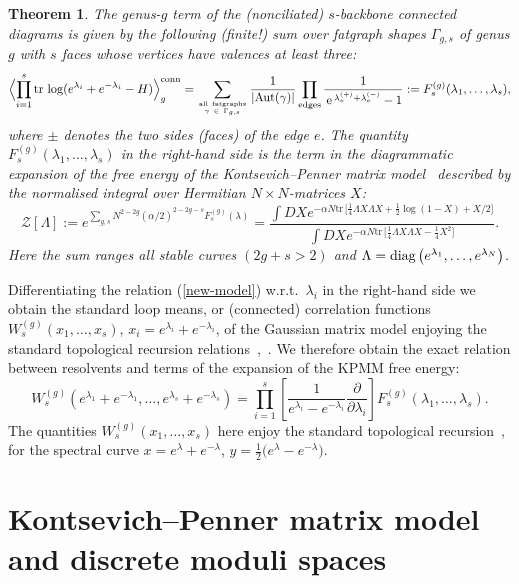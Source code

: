 \documentclass[11pt]{article}
\def\tr{{\mathrm{tr\,}}}
\def\e{{\,\rm e}\,}
\def\pa{\partial}
\def\beq{\begin{equation}}
\def\eeq{\end{equation}}
\theoremstyle{plain}
\newtheorem{theorem}{Theorem}
\theoremstyle{definition}
\let\operatorname=\mathrm
\def\Aut{\operatorname{Aut}}
\def\beq{\begin{equation}}
\def\eeq{\end{equation}}
\begin{document}
\begin{theorem}\label{lm:diagrams}{\rm\cite{ACNP}}
The genus-$g$ term of the (nonciliated) $s$-backbone connected diagrams is given by the following
(finite!) sum over fatgraph shapes $\Gamma_{g,s}$ of genus $g$ with $s$ faces whose
vertices have valences at least three:
\beq
\Bigl\langle\prod_{i=1}^s\tr\log(e^{\lambda_i}+e^{-\lambda_i}-H)\Bigr\rangle_g^{\mathrm{conn}}
=\sum_{{\mathrm{all\ fatgraphs} }\atop \gamma~\in~\Gamma_{g,s}}
\frac{1}{| \Aut (\gamma)|} \prod_{\mathrm{edges}}\frac{1}{\e^{\lambda_e^{(+)}+\lambda_e^{(-)}}-1}
:= F^{(g)}_s(\lambda_1,\dots,\lambda_s),
\label{new-model}
\eeq
where $\pm$ denotes the two sides (faces) of the edge $e$.
The quantity $F^{(g)}_s(\lambda_1,\dots,\lambda_s)$ in the right-hand side is the term in the
diagrammatic expansion of the free energy of the
Kontsevich--Penner matrix model~\cite{ChMak1} described by the normalised integral
over Hermitian $N\times N$-matrices $X$:
\beq
{\mathcal Z}[\Lambda]:=e^{\sum_{g,s}N^{2-2g}(\alpha/2)^{2-2g-s}F^{(g)}_s(\lambda)}=
\frac{\int DX e^{-\alpha N\tr\bigl[\frac14 \Lambda X\Lambda X+\frac12\log(1-X)+X/2 \bigr]}}
{\int DX e^{-\alpha N\tr\bigl[\frac14 \Lambda X\Lambda X-\frac14 X^2\bigr]}}.
\label{KPMM-1}
\eeq
Here the sum ranges all stable curves $(2g+s>2)$ and $\Lambda=\hbox{diag\,}\bigl(e^{\lambda_1},\dots, e^{\lambda_N}\bigr)$.
\end{theorem}


Differentiating the relation (\ref{new-model}) w.r.t.\ $\lambda_i$ in the right-hand side we obtain the standard
loop means, or (connected) correlation functions $W_s^{(g)}(x_1,\dots,x_s)$, $x_i=e^{\lambda_i}+e^{-\lambda_i}$,
of the Gaussian matrix model enjoying the standard topological recursion relations~\cite{Ey},~\cite{ChEy}. We therefore obtain
the exact relation between resolvents and terms of the expansion of the KPMM free energy:
\beq
W_s^{(g)}(e^{\lambda_1}+e^{-\lambda_1},\dots,e^{\lambda_s}+e^{-\lambda_s})=
\prod_{i=1}^s\left[\frac{1}{e^{\lambda_i}-e^{-\lambda_i}}\frac{\pa}{\pa \lambda_i}\right]F^{(g)}_s(\lambda_1,\dots,\lambda_s).
\label{loopmeans-KPMM}
\eeq
The quantities $W_s^{(g)}(x_1,\dots,x_s)$ here
enjoy the standard topological recursion~\cite{ChEy}, \cite{AlMM} for the spectral curve $x=e^{\lambda}+e^{-\lambda}$,
$y=\frac12 \bigl(e^{\lambda}-e^{-\lambda}\bigr)$.



\section{Kontsevich--Penner matrix model and discrete moduli spaces}
\label{s:KPMM}
\setcounter{equation}{0}
\end{document}
